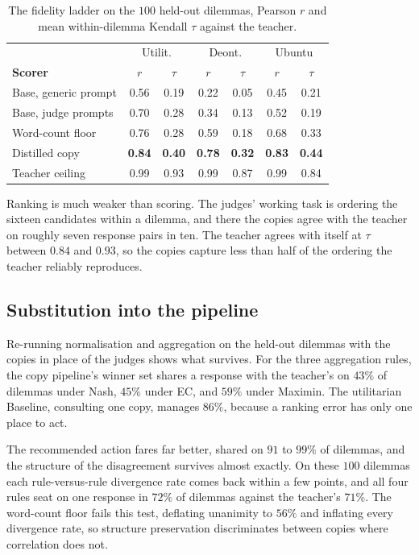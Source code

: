 \documentclass[10pt,twocolumn,a4paper]{article}
\begin{document}
\begin{table}[H]
\centering
\small
\caption{The fidelity ladder on the $100$ held-out dilemmas, Pearson $r$
and mean within-dilemma Kendall $\tau$ against the teacher.}
\label{tab:distil}
\vspace{4pt}
\setlength{\tabcolsep}{4pt}
\begin{tabular}{@{}lcccccc@{}}
\toprule
& \multicolumn{2}{c}{Utilit.} & \multicolumn{2}{c}{Deont.} & \multicolumn{2}{c}{Ubuntu} \\
\textbf{Scorer} & $r$ & $\tau$ & $r$ & $\tau$ & $r$ & $\tau$ \\
\midrule
Base, generic prompt & 0.56 & 0.19 & 0.22 & 0.05 & 0.45 & 0.21 \\
Base, judge prompts  & 0.70 & 0.28 & 0.34 & 0.13 & 0.52 & 0.19 \\
Word-count floor     & 0.76 & 0.28 & 0.59 & 0.18 & 0.68 & 0.33 \\
Distilled copy       & \textbf{0.84} & \textbf{0.40} & \textbf{0.78} & \textbf{0.32} & \textbf{0.83} & \textbf{0.44} \\
Teacher ceiling      & 0.99 & 0.93 & 0.99 & 0.87 & 0.99 & 0.84 \\
\bottomrule
\end{tabular}
\end{table}

Ranking is much weaker than scoring. The judges' working task is
ordering the sixteen candidates within a dilemma, and there the copies
agree with the teacher on roughly seven response pairs in ten. The
teacher agrees with itself at $\tau$ between $0.84$ and $0.93$, so the
copies capture less than half of the ordering the teacher reliably
reproduces.

\subsection{Substitution into the pipeline}

Re-running normalisation and aggregation on the held-out dilemmas with
the copies in place of the judges shows what survives. For the three aggregation rules, the copy
pipeline's winner set shares a response with the teacher's on $43\%$ of
dilemmas under Nash, $45\%$ under EC, and $59\%$ under Maximin. The
utilitarian Baseline, consulting one copy, manages $86\%$, because a
ranking error has only one place to act.

The recommended action fares far better, shared on $91$ to $99\%$ of
dilemmas, and the structure of the disagreement survives almost
exactly. On these $100$ dilemmas each rule-versus-rule divergence rate
comes back within a few points, and all four rules seat on one response
in $72\%$ of dilemmas against the teacher's $71\%$. The
word-count floor fails this test, deflating unanimity to $56\%$ and
inflating every divergence rate, so structure preservation discriminates
between copies where correlation does not.
\end{document}
